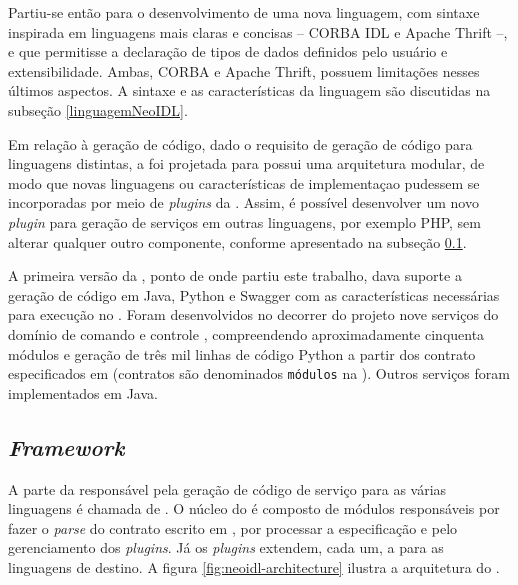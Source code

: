 Partiu-se então para o desenvolvimento de uma nova linguagem, com sintaxe
inspirada em linguagens mais claras e concisas -- CORBA IDL \cite{corba} e
Apache Thrift \cite{thrift} --, e que permitisse a declaração de tipos de
dados definidos pelo usuário e extensibilidade. Ambas,
CORBA e Apache Thrift, possuem limitações nesses últimos aspectos. A sintaxe e
as características da linguagem \neoidl{} são discutidas na subseção \ref{linguagemNeoIDL}.

Em relação à geração de código, dado o requisito de geração de código para
linguagens distintas, a \neoidl{} foi projetada para possui uma arquitetura
modular, de modo que novas linguagens ou características de implementaçao
pudessem se incorporadas por meio de \textit{plugins} da \neoidl{}. Assim, é
possível desenvolver um novo \textit{plugin} para geração de serviços em outras
linguagens, por exemplo PHP, sem alterar qualquer outro componente, conforme
apresentado na subseção \ref{frameNeoIDL}.

A primeira versão da \neoidl{}, ponto de onde partiu este trabalho, dava suporte
a geração de código em Java, Python e Swagger com as características necessárias
para execução no \neocortex{}. Foram desenvolvidos no decorrer do projeto nove
serviços do domínio de comando e controle \cite{david:commandControl},
compreendendo aproximadamente cinquenta módulos e geração de três mil linhas de
código Python a partir dos contrato especificados em \neoidl{} (contratos são
denominados \texttt{módulos} na \neoidl{}). Outros serviços foram implementados em Java. 



\subsection{\textit{Framework}}
\label{frameNeoIDL}
\vspace{-6mm}

A parte da \neoidl{} responsável pela geração de código de
serviço para as várias linguagens é chamada de \framework{} \neoidl{}. O núcleo do \framework{} é
composto de módulos responsáveis por fazer o \textit{parse} do contrato escrito
em \neoidl{}, por processar a especificação e pelo gerenciamento dos
\textit{plugins}. Já os \textit{plugins} extendem, cada um, a \neoidl{} para as
linguagens de destino. A figura \ref{fig:neoidl-architecture} ilustra a
arquitetura do \framework{}.

